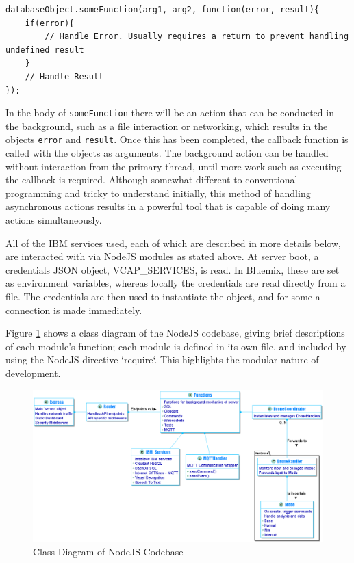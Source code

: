 \documentclass{article}
\begin{document}
\begin{lstlisting}
databaseObject.someFunction(arg1, arg2, function(error, result){
	if(error){
		// Handle Error. Usually requires a return to prevent handling undefined result
	}
	// Handle Result
});

\end{lstlisting}  

In the body of \texttt{someFunction} there will be an action that can be conducted in the background, such as a file interaction or networking, which results in the objects \texttt{error} and \texttt{result}. Once this has been completed, the callback function is called with the objects as arguments. The background action can be handled without interaction from the primary thread, until more work such as executing the callback is required. Although somewhat different to conventional programming and tricky to understand initially, this method of handling asynchronous actions results in a powerful tool that is capable of doing many actions simultaneously. 

All of the IBM services used, each of which are described in more details below, are interacted with via NodeJS modules as stated above. At server boot, a credentials JSON object, VCAP\_SERVICES, is read. In Bluemix, these are set as environment variables, whereas locally the credentials are read directly from a file. The credentials are then used to instantiate the object, and for some a connection is made immediately.

Figure \ref{fig:ServerDiagram} shows a class diagram of the NodeJS codebase, giving brief descriptions of each module's function; each module is defined in its own file, and included by using the NodeJS directive `require`. This highlights the modular nature of development.  

\begin{landscape}
\begin{figure}
\centering
\caption{Class Diagram of NodeJS Codebase\label{fig:ServerDiagram}}
\includegraphics[width=1.5\textheight]{ServerDiagram}
\end{figure}
\end{landscape}
\end{document}
